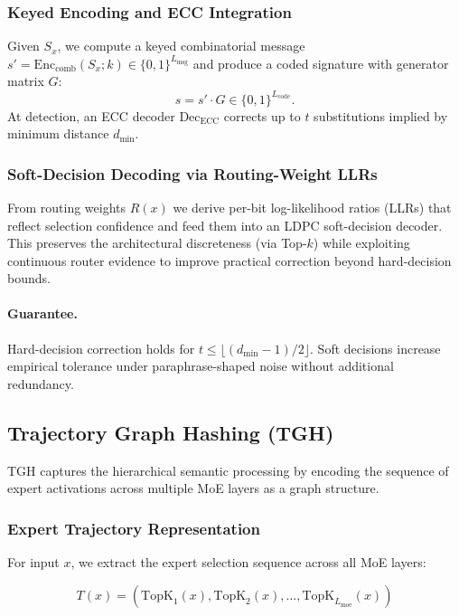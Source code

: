 \subsubsection{Keyed Encoding and ECC Integration}

Given $S_x$, we compute a keyed combinatorial message $s' = \text{Enc}_{\text{comb}}(S_x; k) \in \{0,1\}^{L_{\text{msg}}}$ and produce a coded signature with generator matrix $G$:
\begin{equation}
s = s' \cdot G \in \{0,1\}^{L_{\text{code}}}.
\end{equation}
At detection, an ECC decoder $\text{Dec}_{\text{ECC}}$ corrects up to $t$ substitutions implied by minimum distance $d_{\min}$.

\subsubsection{Soft-Decision Decoding via Routing-Weight LLRs}

From routing weights $R(x)$ we derive per-bit log-likelihood ratios (LLRs) that reflect selection confidence and feed them into an LDPC soft-decision decoder. This preserves the architectural discreteness (via Top-$k$) while exploiting continuous router evidence to improve practical correction beyond hard-decision bounds.

\paragraph{Guarantee.} Hard-decision correction holds for $t \le \lfloor(d_{\min}-1)/2\rfloor$. Soft decisions increase empirical tolerance under paraphrase-shaped noise without additional redundancy.

\subsection{Trajectory Graph Hashing (TGH)}

TGH captures the hierarchical semantic processing by encoding the sequence of expert activations across multiple MoE layers as a graph structure.

\subsubsection{Expert Trajectory Representation}

For input $x$, we extract the expert selection sequence across all MoE layers:

\begin{equation}
T(x) = (\text{TopK}_1(x), \text{TopK}_2(x), \ldots, \text{TopK}_{L_{\text{moe}}}(x))
\end{equation}

